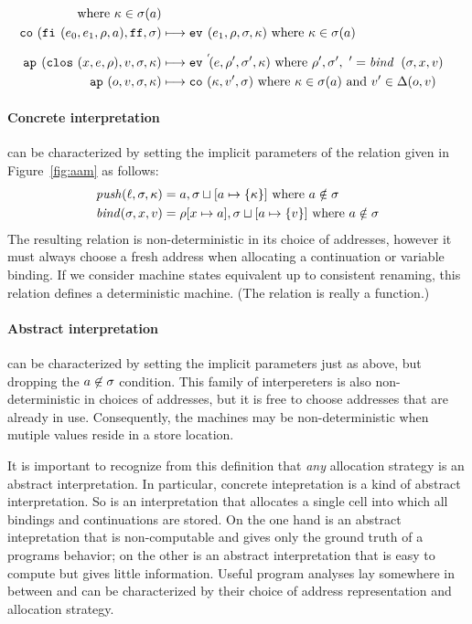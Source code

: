 \documentclass[preprint]{sigplanconf}
\begin{document}
\begin{figure*}
\begin{align*}
\text{ where }\mkont\in\msto(\maddr)
\\
\co{\kif[^\mcntr]{\mexpi0,\mexpi1,\menv,\maddr},\sfalse,\msto} & \machstep
\ev[^\mcntr]{\mexpi1,\menv,\msto,\mkont}
\text{ where }\mkont\in\msto(\maddr)
\\[2mm]
\ap[^\mcntr_\mlab]{\clos{\mvar,\mexp,\menv},\mval,\msto,\mkont} & \machstep
\ev[^{\mcntr'}\!]{\mexp,\menv',\msto',\mkont}
\text{ where }\menv',\msto',\mcntr' = \mathit{bind\,}^{ \mcntr}_\mlab(\msto,\mvar,\mval)
\\
\ap{\mop,\mval,\msto,\mkont} & \machstep
\co{\mkont,\mval',\msto}
\text{ where }\mkont\in\msto(\maddr)
\text{ and } \mval'\in\interpdelta(\mop,\mval)
\end{align*}
\caption{Abstract$^2$ machine for ISWIM}
\label{fig:aam}
\end{figure*}


\paragraph{Concrete interpretation} can be characterized by setting the implicit
parameters of the relation given in Figure~\ref{fig:aam} as follows:
\begin{align*}
\mathit{push}(\ell,\msto,\mkont) &= \maddr,\msto\sqcup[\maddr\mapsto\{\mkont\}]
\mbox{ where }\maddr \notin\msto
\\
\mathit{bind}(\msto,\mvar,\mval) &= \menv[\mvar\mapsto\maddr],\msto\sqcup[\maddr\mapsto\{\mval\}]
\mbox{ where }\maddr \notin\msto
\end{align*}
The resulting relation is non-deterministic in its choice of
addresses, however it must always choose a fresh address when
allocating a continuation or variable binding.  If we consider machine
states equivalent up to consistent renaming, this relation defines
a deterministic machine.  (The relation is really a function.)


\paragraph{Abstract interpretation} can be characterized by setting the implicit
parameters just as above, but dropping the $\maddr \not\in \msto$
condition.  This family of interpereters is also non-deterministic in
choices of addresses, but it is free to choose addresses that are
already in use.  Consequently, the machines may be non-deterministic
when mutiple values reside in a store location.

It is important to recognize from this definition that \emph{any}
allocation strategy is an abstract interpretation.  In particular,
concrete intepretation is a kind of abstract interpretation.  So is an
interpretation that allocates a single cell into which all bindings
and continuations are stored.  On the one hand is an abstract
intepretation that is non-computable and gives only the ground truth
of a programs behavior; on the other is an abstract interpretation
that is easy to compute but gives little information.  Useful program
analyses lay somewhere in between and can be characterized by their
choice of address representation and allocation strategy.
\end{document}
